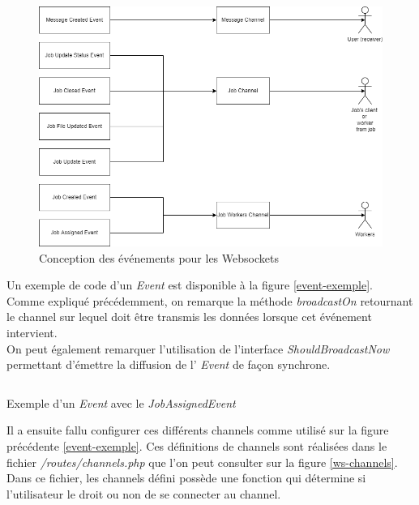 \documentclass[
    iai, %
    il, %
]{heig-tb}
\begin{document}
\begin{center}
    \begin{figure}
        \includegraphics[width=\textwidth]{./assets/figures/ws-conception-notifications.drawio.png}
        \caption{Conception des événements pour les Websockets \label{ws-conception-notifications.drawio}}
    \end{figure}
\end{center}

Un exemple de code d'un \emph{Event} est disponible à la figure \ref{event-exemple}. \\
Comme expliqué précédemment, on remarque la méthode \emph{broadcastOn} retournant le channel sur lequel doit être transmis les données lorsque cet événement intervient. \\
On peut également remarquer l'utilisation de l'interface \emph{ShouldBroadcastNow} permettant d'émettre la diffusion de l' \emph{Event} de façon synchrone.

\begin{listing}[h]
    \inputminted{php}{assets/code/JobAssignedEvent.php}
    \caption{Exemple d'un \emph{Event} avec le \emph{JobAssignedEvent} \label{event-exemple}}
\end{listing}

Il a ensuite fallu configurer ces différents channels comme utilisé sur la figure précédente \ref{event-exemple}. Ces définitions de channels sont réalisées dans le fichier \emph{/routes/channels.php} que l'on peut consulter sur la figure \ref{ws-channels}. \\
Dans ce fichier, les channels défini possède une fonction qui détermine si l'utilisateur le droit ou non de se connecter au channel.
\end{document}
